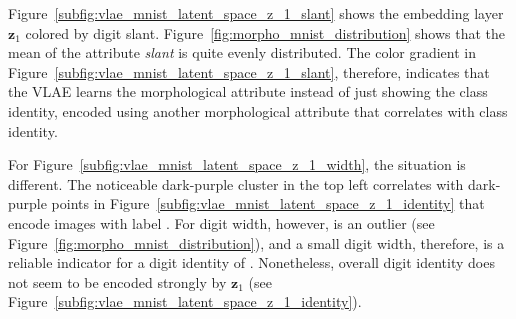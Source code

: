 Figure~\ref{subfig:vlae_mnist_latent_space_z_1_slant} shows the embedding layer $\bm{z}_1$ colored by digit slant.
Figure~\ref{fig:morpho_mnist_distribution} shows that the mean of the attribute \textit{slant} is quite evenly distributed.
The color gradient in Figure~\ref{subfig:vlae_mnist_latent_space_z_1_slant}, therefore, indicates that the VLAE learns the morphological attribute instead of just showing the class identity, encoded using another morphological attribute that correlates with class identity.

For Figure~\ref{subfig:vlae_mnist_latent_space_z_1_width}, the situation is different.
The noticeable dark-purple cluster in the top left correlates with dark-purple points in Figure~\ref{subfig:vlae_mnist_latent_space_z_1_identity} that encode images with label .
For digit width, however,  is an outlier (see Figure~\ref{fig:morpho_mnist_distribution}), and a small digit width, therefore, is a reliable indicator for a digit identity of .
Nonetheless, overall digit identity does not seem to be encoded strongly by $\bm{z}_1$ (see Figure~\ref{subfig:vlae_mnist_latent_space_z_1_identity}).

